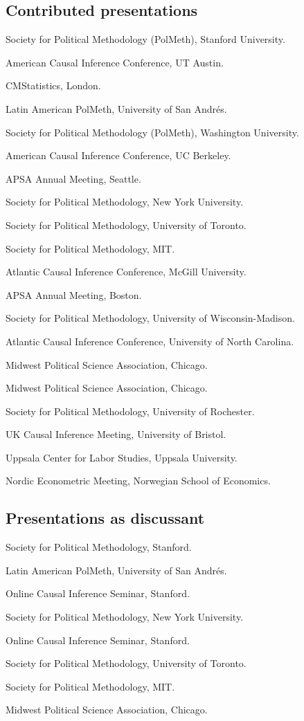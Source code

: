 \documentclass[10pt,letterpaper]{article}
\newenvironment{singledatelist}{
	\begin{list}{}{
		\setlength{\parskip}{0pt}
		\setlength{\itemsep}{4pt}
		\setlength{\parsep}{0.3em}
		\setlength{\leftmargin}{3.5em}
		\setlength{\labelwidth}{3.5em}
		\setlength{\labelsep}{1.5em}
		}
	}{
\end{list}
}
\newcommand{\dateitem}[2][]{\item[{#1}] {#2}}
\begin{document}
	\subsection*{Contributed presentations}

	\begin{singledatelist}
		\dateitem[2023]{Society for Political Methodology (PolMeth), Stanford University.}
		\dateitem{American Causal Inference Conference, UT Austin.}
		\dateitem[2022]{CMStatistics, London.}
		\dateitem{Latin American PolMeth, University of San Andrés.}
		\dateitem{Society for Political Methodology (PolMeth), Washington University.}
		\dateitem{American Causal Inference Conference, UC Berkeley.}
		\dateitem[2021]{APSA Annual Meeting, Seattle.}
		\dateitem{Society for Political Methodology, New York University.}
		\dateitem[2020]{Society for Political Methodology, University of Toronto.}
		\dateitem[2019]{Society for Political Methodology, MIT.}
		\dateitem{Atlantic Causal Inference Conference, McGill University.}
		\dateitem[2018]{APSA Annual Meeting, Boston.}
		\dateitem[2017]{Society for Political Methodology, University of Wisconsin-Madison.}
		\dateitem{Atlantic Causal Inference Conference, University of North Carolina.}
		\dateitem{Midwest Political Science Association, Chicago.}
		\dateitem[2016]{Midwest Political Science Association, Chicago.}
		\dateitem[2015]{Society for Political Methodology, University of Rochester.}
		\dateitem{UK Causal Inference Meeting, University of Bristol.}
		\dateitem[2013]{Uppsala Center for Labor Studies, Uppsala University.}
		\dateitem{Nordic Econometric Meeting, Norwegian School of Economics.}
	\end{singledatelist}


	\subsection*{Presentations as discussant}

	\begin{singledatelist}
		\dateitem[2023]{Society for Political Methodology, Stanford.}
		\dateitem[2022]{Latin American PolMeth, University of San Andrés.}
		\dateitem{Online Causal Inference Seminar, Stanford.}
		\dateitem[2021]{Society for Political Methodology, New York University.}
		\dateitem{Online Causal Inference Seminar, Stanford.}
		\dateitem[2020]{Society for Political Methodology, University of Toronto.}
		\dateitem[2019]{Society for Political Methodology, MIT.}
		\dateitem[2017]{Midwest Political Science Association, Chicago.}
	\end{singledatelist}
\end{document}
